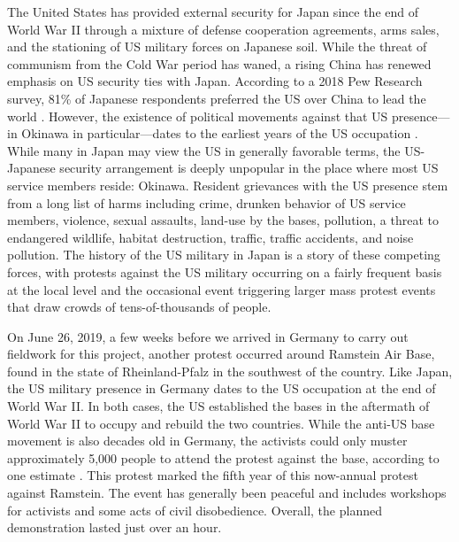 The United States has provided external security for Japan since the end of World War II through a mixture of defense cooperation agreements, arms sales, and the stationing of US military forces on Japanese soil. While the threat of communism from the Cold War period has waned, a rising China has renewed emphasis on US security ties with Japan. According to a 2018 Pew Research survey, 81\% of Japanese respondents preferred the US over China to lead the world \cite{StokesandDevlin2018}. However, the existence of political movements against that US presence---in Okinawa in particular---dates to the earliest years of the US occupation \cite{cottrellmoorer1977,akibayashi2009}. While many in Japan may view the US in generally favorable terms, the US-Japanese security arrangement is deeply unpopular in the place where most US service members reside: Okinawa. Resident grievances with the US presence stem from a long list of harms including crime, drunken behavior of US service members, violence, sexual assaults, land-use by the bases, pollution, a threat to endangered wildlife, habitat destruction, traffic, traffic accidents, and noise pollution.   The history of the US military in Japan is a story of these competing forces, with protests against the US military occurring on a fairly frequent basis at the local level and the occasional event triggering larger mass protest events that draw crowds of tens-of-thousands of people. 




On June 26, 2019, a few weeks before we arrived in Germany to carry out fieldwork for this project, another protest occurred around Ramstein Air Base, found in the state of Rheinland-Pfalz in the southwest of the country. Like Japan, the US military presence in Germany dates to the US occupation at the end of World War II. In both cases, the US established the bases in the aftermath of World War II to occupy and rebuild the two countries. While the anti-US base movement is also decades old in Germany, the activists could only muster approximately 5,000 people to attend the protest against the base, according to one estimate \cite{berlinone20190723}. This protest marked the fifth year of this now-annual protest against Ramstein. The event has generally been peaceful and includes workshops for activists and some acts of civil disobedience. Overall, the planned demonstration lasted just over an hour.

